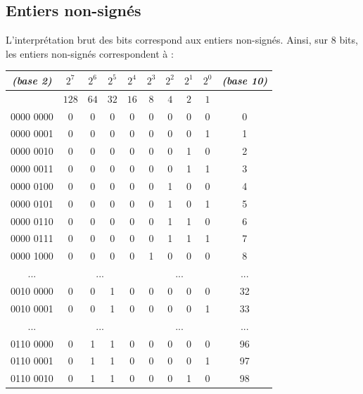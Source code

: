 \documentclass[11pt,a4paper]{article}
\begin{document}
\bigskip


\subsection{Entiers non-signés}

\medskip

L'interprétation brut des bits correspond aux entiers non-signés.
Ainsi, sur 8 bits, les entiers non-signés correspondent à :

\bigskip

\begin{center}
\begin{tabular}{ | c | c c c c | c c c c | c |}
\hline
\textit{(base 2)} & $ 2^7 $ & $ 2^6 $ & $ 2^5 $ & $ 2^4 $   &   $ 2^3 $ & $ 2^2 $ & $ 2^1 $ & $ 2^0 $ & \textit{(base 10)} \\
\hline
         & $ 128 $ & $  64 $ & $  32 $ & $  16 $   &   $   8 $ & $   4 $ & $   2 $ & $   1 $ & \\
\hline
0000 0000  &  0 & 0 & 0 & 0  &  0 & 0 & 0 & 0   & 0 \\
0000 0001  &  0 & 0 & 0 & 0  &  0 & 0 & 0 & 1   & 1 \\
0000 0010  &  0 & 0 & 0 & 0  &  0 & 0 & 1 & 0   & 2 \\
0000 0011  &  0 & 0 & 0 & 0  &  0 & 0 & 1 & 1   & 3 \\
0000 0100  &  0 & 0 & 0 & 0  &  0 & 1 & 0 & 0   & 4 \\
0000 0101  &  0 & 0 & 0 & 0  &  0 & 1 & 0 & 1   & 5 \\
0000 0110  &  0 & 0 & 0 & 0  &  0 & 1 & 1 & 0   & 6 \\
0000 0111  &  0 & 0 & 0 & 0  &  0 & 1 & 1 & 1   & 7 \\
0000 1000  &  0 & 0 & 0 & 0  &  1 & 0 & 0 & 0   & 8 \\
... & \multicolumn{4}{|c|}{...} & \multicolumn{4}{c|}{...} & ... \\
0010 0000  &  0 & 0 & 1 & 0  &  0 & 0 & 0 & 0   & 32 \\
0010 0001  &  0 & 0 & 1 & 0  &  0 & 0 & 0 & 1   & 33 \\
... & \multicolumn{4}{|c|}{...} & \multicolumn{4}{c|}{...} & ... \\
0110 0000  &  0 & 1 & 1 & 0  &  0 & 0 & 0 & 0   & 96 \\
0110 0001  &  0 & 1 & 1 & 0  &  0 & 0 & 0 & 1   & 97 \\
0110 0010  &  0 & 1 & 1 & 0  &  0 & 0 & 1 & 0   & 98 \\

\end{tabular}
\end{center}
\end{document}
